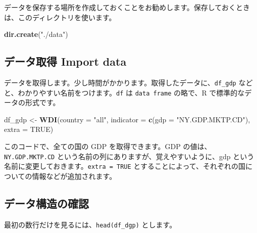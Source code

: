 \documentclass[
  xelatex, ja=standard]{bxjsbook}
\newenvironment{Shaded}{\begin{snugshade}}{\end{snugshade}}
\newcommand{\AttributeTok}[1]{\textcolor[rgb]{0.13,0.29,0.53}{#1}}
\newcommand{\ConstantTok}[1]{\textcolor[rgb]{0.56,0.35,0.01}{#1}}
\newcommand{\FunctionTok}[1]{\textcolor[rgb]{0.13,0.29,0.53}{\textbf{#1}}}
\newcommand{\NormalTok}[1]{#1}
\newcommand{\OtherTok}[1]{\textcolor[rgb]{0.56,0.35,0.01}{#1}}
\newcommand{\StringTok}[1]{\textcolor[rgb]{0.31,0.60,0.02}{#1}}
\theoremstyle{definition}
\theoremstyle{definition}
\theoremstyle{definition}
\theoremstyle{definition}
\theoremstyle{remark}
\begin{document}
データを保存する場所を作成しておくことをお勧めします。保存しておくときは、このディレクトリを使います。

\begin{Shaded}
\begin{Highlighting}[]
\FunctionTok{dir.create}\NormalTok{(}\StringTok{"./data"}\NormalTok{)}
\end{Highlighting}
\end{Shaded}

\hypertarget{ux30c7ux30fcux30bfux53d6ux5f97-import-data}{%
\subsection{データ取得 Import data}\label{ux30c7ux30fcux30bfux53d6ux5f97-import-data}}

データを取得します。少し時間がかかります。取得したデータに、\texttt{df\_gdp} などと、わかりやすい名前をつけます。\texttt{df} は \texttt{data\ frame} の略で、R で標準的なデータの形式です。

\begin{Shaded}
\begin{Highlighting}[]
\NormalTok{df\_gdp }\OtherTok{\textless{}{-}} \FunctionTok{WDI}\NormalTok{(}\AttributeTok{country =} \StringTok{"all"}\NormalTok{, }
              \AttributeTok{indicator =} \FunctionTok{c}\NormalTok{(}\AttributeTok{gdp =} \StringTok{"NY.GDP.MKTP.CD"}\NormalTok{), }
              \AttributeTok{extra =} \ConstantTok{TRUE}\NormalTok{)}
\end{Highlighting}
\end{Shaded}

このコードで、全ての国の GDP を取得できます。GDP の値は、\texttt{NY.GDP.MKTP.CD} という名前の列にありますが、覚えやすいように、gdp という名前に変更しておきます。\texttt{extra\ =\ TRUE} とすることによって、それぞれの国についての情報などが追加されます。

\hypertarget{ux30c7ux30fcux30bfux69cbux9020ux306eux78baux8a8d}{%
\subsection{データ構造の確認}\label{ux30c7ux30fcux30bfux69cbux9020ux306eux78baux8a8d}}

最初の数行だけを見るには、\texttt{head(df\_dgp)} とします。
\end{document}
